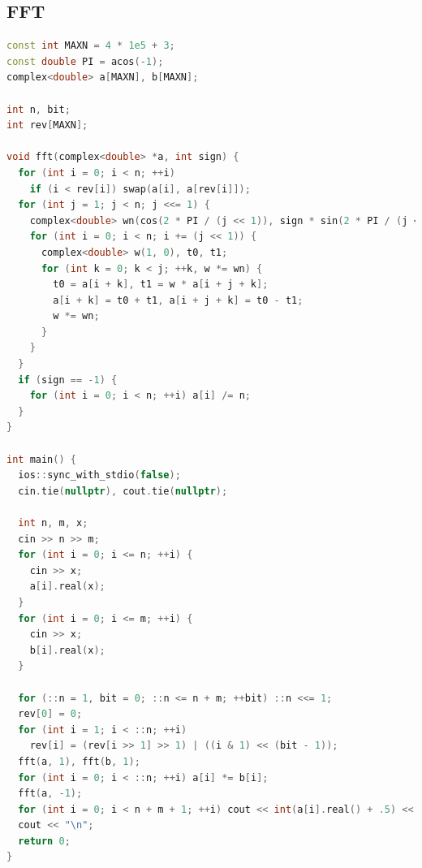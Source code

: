 \documentclass[twoside]{article}
\begin{document}
\subsection{FFT}
\begin{lstlisting}[language=c++]
const int MAXN = 4 * 1e5 + 3;
const double PI = acos(-1);
complex<double> a[MAXN], b[MAXN];

int n, bit;
int rev[MAXN];

void fft(complex<double> *a, int sign) {
  for (int i = 0; i < n; ++i)
    if (i < rev[i]) swap(a[i], a[rev[i]]);
  for (int j = 1; j < n; j <<= 1) {
    complex<double> wn(cos(2 * PI / (j << 1)), sign * sin(2 * PI / (j << 1)));
    for (int i = 0; i < n; i += (j << 1)) {
      complex<double> w(1, 0), t0, t1;
      for (int k = 0; k < j; ++k, w *= wn) {
        t0 = a[i + k], t1 = w * a[i + j + k];
        a[i + k] = t0 + t1, a[i + j + k] = t0 - t1;
        w *= wn;
      }
    }
  }
  if (sign == -1) {
    for (int i = 0; i < n; ++i) a[i] /= n;
  }
}

int main() {
  ios::sync_with_stdio(false);
  cin.tie(nullptr), cout.tie(nullptr);

  int n, m, x;
  cin >> n >> m;
  for (int i = 0; i <= n; ++i) {
    cin >> x;
    a[i].real(x);
  }
  for (int i = 0; i <= m; ++i) {
    cin >> x;
    b[i].real(x);
  }

  for (::n = 1, bit = 0; ::n <= n + m; ++bit) ::n <<= 1;
  rev[0] = 0;
  for (int i = 1; i < ::n; ++i)
    rev[i] = (rev[i >> 1] >> 1) | ((i & 1) << (bit - 1));
  fft(a, 1), fft(b, 1);
  for (int i = 0; i < ::n; ++i) a[i] *= b[i];
  fft(a, -1);
  for (int i = 0; i < n + m + 1; ++i) cout << int(a[i].real() + .5) << " ";
  cout << "\n";
  return 0;
}

\end{lstlisting}
\end{document}
